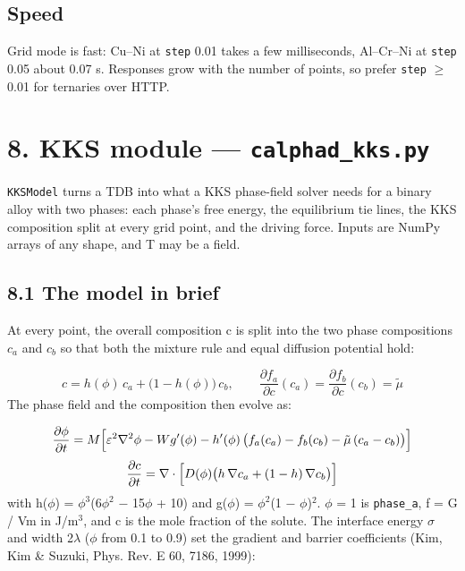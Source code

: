 \documentclass[12pt,a4paper]{article}
\begin{document}
\subsection*{Speed}
Grid mode is fast: Cu--Ni at \texttt{step} 0.01 takes a few milliseconds, Al--Cr--Ni at \texttt{step} 0.05 about 0.07 s. Responses grow with the number of points, so prefer \texttt{step} \(\ge\) 0.01 for ternaries over HTTP.


\section*{8. KKS module --- \texttt{calphad\_\allowbreak{}kks.\allowbreak{}py}}
\texttt{KKSModel} turns a TDB into what a KKS phase-field solver needs for a binary alloy with two phases: each phase's free energy, the equilibrium tie lines, the KKS composition split at every grid point, and the driving force. Inputs are NumPy arrays of any shape, and T may be a field.


\subsection*{8.1 The model in brief}
At every point, the overall composition c is split into the two phase compositions \(c_{a}\) and \(c_{b}\) so that both the mixture rule and equal diffusion potential hold:

\begin{equation*}
c = h(\phi)\,c_a + \bigl(1 - h(\phi)\bigr)\,c_b, \qquad \frac{\partial f_a}{\partial c}(c_a) = \frac{\partial f_b}{\partial c}(c_b) = \tilde\mu
\end{equation*}
The phase field and the composition then evolve as:

\begin{equation*}
\frac{\partial \phi}{\partial t} = M\Bigl[\varepsilon^2 \nabla^2\phi - W g'(\phi) - h'(\phi)\,\bigl(f_a(c_a) - f_b(c_b) - \tilde\mu\,(c_a - c_b)\bigr)\Bigr]
\end{equation*}
\begin{equation*}
\frac{\partial c}{\partial t} = \nabla\cdot\Bigl[D(\phi)\bigl(h\,\nabla c_a + (1-h)\,\nabla c_b\bigr)\Bigr]
\end{equation*}
with h(\(\phi\)) = \(\phi ^{3}\)(6\(\phi ^{2}\) \(-\) 15\(\phi\) + 10) and g(\(\phi\)) = \(\phi ^{2}\)(1 \(-\) \(\phi\))\(^{2}\). \(\phi\) = 1 is \texttt{phase\_\allowbreak{}a}, f = G / Vm in J/m\(^{3}\), and c is the mole fraction of the solute. The interface energy \(\sigma\) and width 2\(\lambda\) (\(\phi\) from 0.1 to 0.9) set the gradient and barrier coefficients (Kim, Kim \& Suzuki, Phys. Rev. E 60, 7186, 1999):
\end{document}
